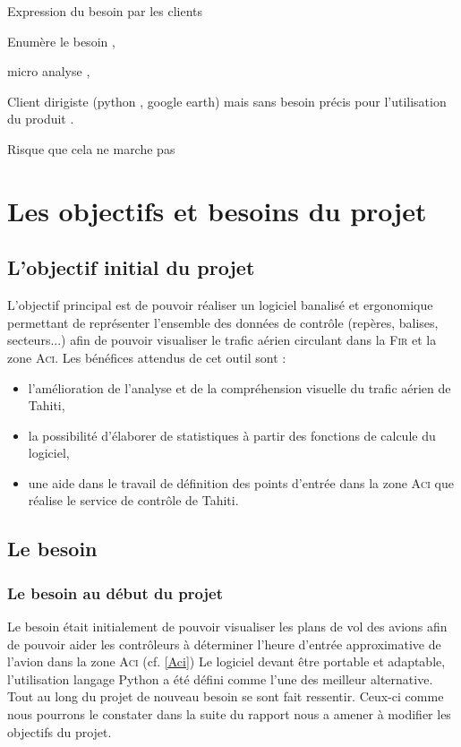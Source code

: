 Expression du besoin par les clients\par
Enumère le besoin ,\par
micro analyse ,\par
Client dirigiste (python , google earth) mais sans besoin précis pour l’utilisation du produit .\par
Risque que cela ne marche pas
 
\section{Les objectifs et besoins du projet}
    \subsection{L'objectif initial du projet}
L’objectif principal est de pouvoir réaliser un logiciel banalisé et ergonomique permettant de
représenter l’ensemble des données de contrôle (repères, balises, secteurs...) afin de pouvoir
visualiser le trafic aérien circulant dans la \textsc{Fir} et la zone \textsc{Aci}.
Les bénéfices attendus de cet outil sont :
\begin{itemize}
\item l’amélioration de l’analyse et de la compréhension visuelle du trafic aérien de Tahiti,
\item la possibilité d’élaborer de statistiques à partir des fonctions de calcule du logiciel,
\item une aide dans le travail de définition des points d’entrée dans la zone \textsc{Aci} que réalise le
service de contrôle de Tahiti.
\end{itemize}

    \subsection{Le besoin}
        \subsubsection{Le besoin au début du projet}
Le besoin était initialement de pouvoir visualiser les plans de vol des avions afin de pouvoir aider les contrôleurs à déterminer l'heure d'entrée approximative de l'avion dans la zone \textsc{Aci} (cf. \vref{Aci})
Le logiciel devant être portable et adaptable, l'utilisation langage Python a été défini comme l'une des meilleur alternative.
Tout au long du projet de nouveau besoin se sont fait ressentir. Ceux-ci comme nous pourrons le constater dans la suite du rapport nous a amener à modifier les objectifs du projet.

